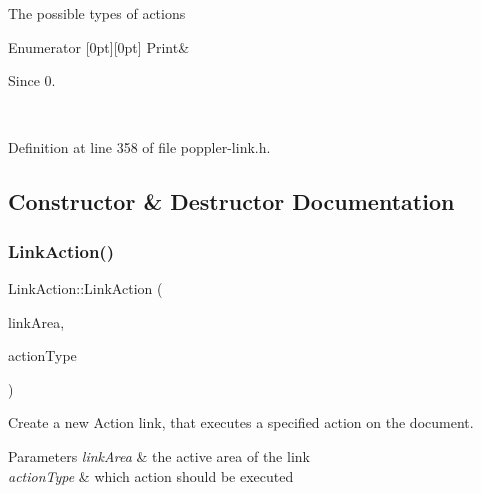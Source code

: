 The possible types of actions \begin{DoxyEnumFields}{Enumerator}
[0pt][0pt]{}\mbox{\label{class_poppler_1_1_link_action_af9c6ee08681c0993083a6f817f9d099cade17a43b813a27e3363a3efca2e9a946}} 
Print&\begin{DoxySince}{Since}
0. 
\end{DoxySince}
\\
\hline

\end{DoxyEnumFields}


Definition at line 358 of file poppler-\/link.\+h.



\subsection{Constructor \& Destructor Documentation}
\mbox{\label{class_poppler_1_1_link_action_a166c89b82bca185dec243b9ff2c09103}} 
\subsubsection{\texorpdfstring{Link\+Action()}{LinkAction()}}
{\footnotesize\ttfamily Link\+Action\+::\+Link\+Action (\begin{DoxyParamCaption}\item[{const Q\+RectF \&}]{link\+Area,  }\item[{\hyperlink{class_poppler_1_1_link_action_af9c6ee08681c0993083a6f817f9d099c}{Action\+Type}}]{action\+Type }\end{DoxyParamCaption})}

Create a new Action link, that executes a specified action on the document.


\begin{DoxyParams}{Parameters}
{\em link\+Area} & the active area of the link \\
\hline
{\em action\+Type} & which action should be executed \\
\hline
\end{DoxyParams}


